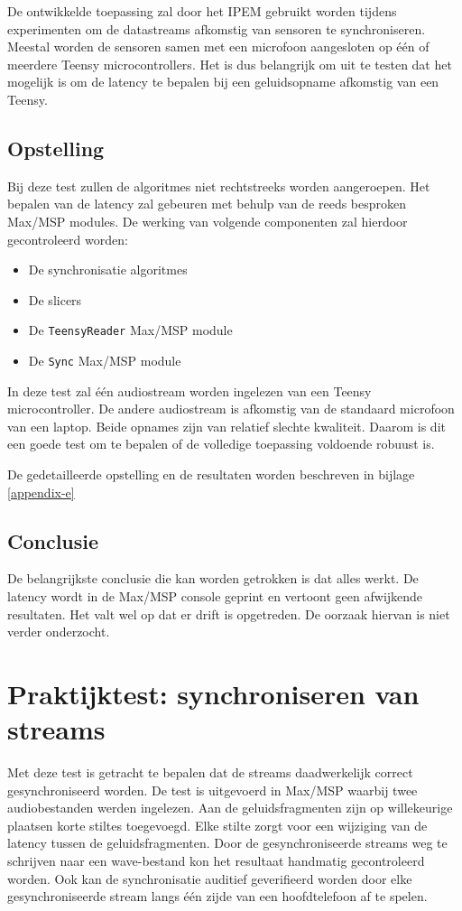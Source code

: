 De ontwikkelde toepassing zal door het IPEM gebruikt worden tijdens experimenten om de datastreams afkomstig van sensoren te synchroniseren. Meestal worden de sensoren samen met een microfoon aangesloten op één of meerdere Teensy microcontrollers. Het is dus belangrijk om uit te testen dat het mogelijk is om de latency te bepalen bij een geluidsopname afkomstig van een Teensy.

\subsection{Opstelling}

Bij deze test zullen de algoritmes niet rechtstreeks worden aangeroepen. Het bepalen van de latency zal gebeuren met behulp van de reeds besproken Max/MSP modules. De werking van volgende componenten zal hierdoor gecontroleerd worden:
\begin{itemize}[noitemsep]
	\item De synchronisatie algoritmes
	\item De slicers
	\item De \texttt{TeensyReader} Max/MSP module
	\item De \texttt{Sync} Max/MSP module
\end{itemize}

In deze test zal één audiostream worden ingelezen van een Teensy microcontroller. De andere audiostream is afkomstig van de standaard microfoon van een laptop. Beide opnames zijn van relatief slechte kwaliteit. Daarom is dit een goede test om te bepalen of de volledige toepassing voldoende robuust is.

De gedetailleerde opstelling en de resultaten worden beschreven in bijlage \ref{appendix-e}

\subsection{Conclusie}

De belangrijkste conclusie die kan worden getrokken is dat alles werkt. De latency wordt in de Max/MSP console geprint en vertoont geen afwijkende resultaten. Het valt wel op dat er drift is opgetreden. De oorzaak hiervan is niet verder onderzocht. 

\section{Praktijktest: synchroniseren van streams}

Met deze test is getracht te bepalen dat de streams daadwerkelijk correct gesynchroniseerd worden. De test is uitgevoerd in Max/MSP waarbij twee audiobestanden werden ingelezen. Aan de geluidsfragmenten zijn op willekeurige plaatsen korte stiltes toegevoegd. Elke stilte zorgt voor een wijziging van de latency tussen de geluidsfragmenten. Door de gesynchroniseerde streams weg te schrijven naar een wave-bestand kon het resultaat handmatig gecontroleerd worden. Ook kan de synchronisatie auditief geverifieerd worden door elke gesynchroniseerde stream langs één zijde van een hoofdtelefoon af te spelen.

